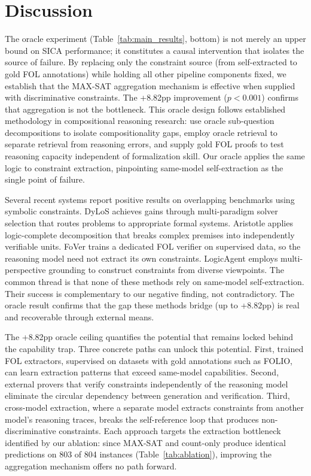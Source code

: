 \section{Discussion}
\label{sec:discussion}

The oracle experiment (Table~\ref{tab:main_results}, bottom) is not merely an upper bound on SICA performance; it constitutes a causal intervention that isolates the source of failure. By replacing only the constraint source (from self-extracted to gold FOL annotations) while holding all other pipeline components fixed, we establish that the MAX-SAT aggregation mechanism is effective when supplied with discriminative constraints. The +8.82pp improvement ($p < 0.001$) confirms that aggregation is not the bottleneck. This oracle design follows established methodology in compositional reasoning research: \citet{press2023compositionality} use oracle sub-question decompositions to isolate compositionality gaps, \citet{trivedi2023ircot} employ oracle retrieval to separate retrieval from reasoning errors, and \citet{saparov2023greedy} supply gold FOL proofs to test reasoning capacity independent of formalization skill. Our oracle applies the same logic to constraint extraction, pinpointing same-model self-extraction as the single point of failure.

Several recent systems report positive results on overlapping benchmarks using symbolic constraints. DyLoS \citep{xu2026dylos} achieves gains through multi-paradigm solver selection that routes problems to appropriate formal systems. Aristotle \citep{li2025aristotle} applies logic-complete decomposition that breaks complex premises into independently verifiable units. FoVer \citep{wang2025fover} trains a dedicated FOL verifier on supervised data, so the reasoning model need not extract its own constraints. LogicAgent \citep{luo2025logicagent} employs multi-perspective grounding to construct constraints from diverse viewpoints. The common thread is that none of these methods rely on same-model self-extraction. Their success is complementary to our negative finding, not contradictory. The oracle result confirms that the gap these methods bridge (up to +8.82pp) is real and recoverable through external means.

The +8.82pp oracle ceiling quantifies the potential that remains locked behind the capability trap. Three concrete paths can unlock this potential. First, trained FOL extractors, supervised on datasets with gold annotations such as FOLIO, can learn extraction patterns that exceed same-model capabilities. Second, external provers that verify constraints independently of the reasoning model eliminate the circular dependency between generation and verification. Third, cross-model extraction, where a separate model extracts constraints from another model's reasoning traces, breaks the self-reference loop that produces non-discriminative constraints. Each approach targets the extraction bottleneck identified by our ablation: since MAX-SAT and count-only produce identical predictions on 803 of 804 instances (Table~\ref{tab:ablation}), improving the aggregation mechanism offers no path forward.

